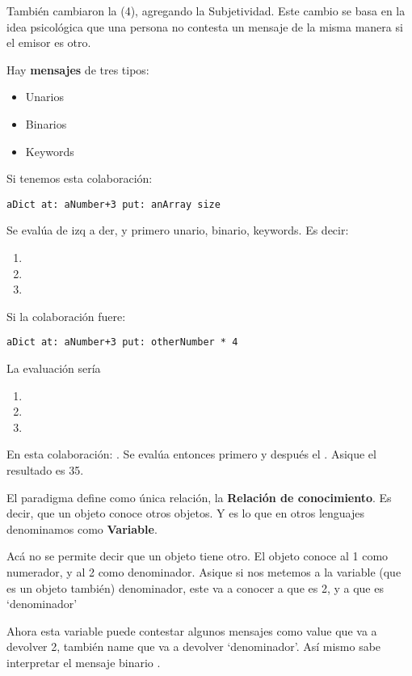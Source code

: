 También cambiaron la (4), agregando la Subjetividad. Este cambio se basa en la idea psicológica que una persona no contesta un mensaje de la misma manera si el emisor es otro. 

Hay \textbf{mensajes} de tres tipos: 
\begin{itemize}
\item Unarios
\item Binarios
\item Keywords
\end{itemize}

Si tenemos esta colaboración: 
\begin{verbatim}
aDict at: aNumber+3 put: anArray size
\end{verbatim}

Se evalúa de izq a der, y primero unario, binario, keywords. Es decir:
\begin{enumerate}
\item {}
\item {}
\item {}
\end{enumerate}

Si la colaboración fuere: 
\begin{verbatim}
aDict at: aNumber+3 put: otherNumber * 4
\end{verbatim}

La evaluación sería
\begin{enumerate}
 \item {}
 \item {}
 \item {}
\end{enumerate}

En esta colaboración: . Se evalúa entonces primero  y después el . Asique el resultado es 35. 

El paradigma define como única relación, la \textbf{Relación de conocimiento}. Es decir, que un objeto conoce otros objetos. Y es lo que en otros lenguajes denominamos como \textbf{Variable}. 

Acá no se permite decir que un objeto tiene otro. El objeto  conoce al 1 como numerador, y al 2 como denominador. 
Asique si nos metemos a la variable (que es un objeto también) denominador, este va a conocer a  que es 2, y a  que es ‘denominador’

Ahora esta variable puede contestar algunos mensajes como value que va a devolver 2, también name que va a devolver ‘denominador’. Así mismo sabe interpretar el mensaje binario . 

